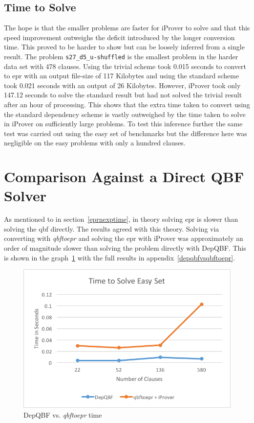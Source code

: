 \subsection{Time to Solve} \label{tvsstdsolve}
The hope is that the smaller problems are faster for iProver to solve and that this speed improvement outweighs the deficit introduced by the longer conversion time. This proved to be harder to show but can be loosely inferred from a single result. The problem \texttt{s27\_d5\_u-shuffled} is the smallest problem in the harder data set with 478 clauses. Using the trivial scheme took 0.015 seconds to convert to \gls{epr} with an output file-size of 117 Kilobytes and using the standard scheme took 0.021 seconds with an output of 26 Kilobytes. However, iProver took only 147.12 seconds to solve the standard result but had not solved the trivial result after an hour of processing. This shows that the extra time taken to convert using the standard dependency scheme is vastly outweighed by the time taken to solve in iProver on sufficiently large problems. To test this inference further the same test was carried out using the easy set of benchmarks but the difference here was negligible on the easy problems with only a hundred clauses.

\section{Comparison Against a Direct QBF Solver}
As mentioned to in section~\ref{eprnexptime}, in theory solving \gls{epr} is slower than solving the \gls{qbf} directly. The results agreed with this theory. Solving via converting with \textit{qbftoepr} and solving the \gls{epr} with iProver was approximately an order of magnitude slower than solving the problem directly with DepQBF. This is shown in the graph~\ref{depqbfvsqbftoeprgraph} with the full results in appendix~\ref{depqbfvsqbftoepr}.

\begin{figure}[h]
\caption{DepQBF vs. \textit{qbftoepr} time}
\label{depqbfvsqbftoeprgraph}
\begin{CenteredBox}
\includegraphics{depqbfvsqbftoepr.png}
\end{CenteredBox}
\end{figure}

